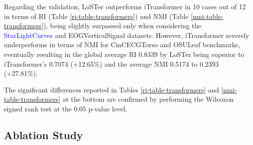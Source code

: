 \documentclass[times, review, 10pt]{elsarticle}
\begin{document}
Regarding the validation, LoSTer outperforms iTransformer in 10 cases out of 12 in terms of RI (Table \ref{ri-table-transformers}) and NMI (Table \ref{nmi-table-transformers}), being slightly surpassed only when considering the \textcolor{blue}{StarLightCurves} and EOGVerticalSignal datasets. However, iTransformer severely underperforms in terms of NMI for CinCECGTorso and OSULeaf benchmarks, eventually resulting in the global average RI 0.8339 by LoSTer being superior to iTransformer's 0.7074 (+12.65\%) and the average NMI 0.5174 to 0.2393 (+27.81\%).

The significant differences reported in Tables \ref{ri-table-transformers} and \ref{nmi-table-transformers} at the bottom are confirmed by performing the Wilcoxon signed rank test at the 0.05 p-value level.

\subsection{Ablation Study}
\end{document}
